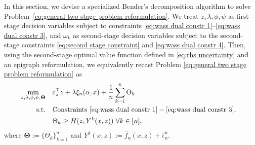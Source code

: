\documentclass[onefignum,onetabnum]{siamart251216}
\begin{document}
In this section, we devise a specialized Bender's decomposition algorithm to solve Problem\ \eqref{eq:general two stage problem reformulation}. We treat $z,\lambda,\phi,\psi$ as first-stage decision variables subject to constraints \eqref{eq:wass dual constr 1}--\eqref{eq:wass dual constr 3}, and $\omega_k$ as second-stage decision variables subject to the second-stage constraints \eqref{eq:second stage constraint} and \eqref{eq:wass dual constr 4}. Then, using the second-stage optimal value function defined in \eqref{eq:rhs uncertainty} and an epigraph reformulation, we equivalently recast Problem \eqref{eq:general two stage problem reformulation}   as\vspace*{-0.05in} 
\begin{align} 
    \min_{z, \lambda, \phi, \psi, \mathbf{\Theta}} \quad & c_z^\top z + \lambda \xi_n(\alpha,x) + \frac{1}{n} \sum_{k=1}^n\Theta_k \label{eq:full benders problem} \\
    \textrm{s.t.}\quad & \text{Constraints}\ \eqref{eq:wass dual constr 1}-\eqref{eq:wass dual constr 3}, \nonumber \\
    \quad & \Theta_k \ge H(z,Y^k(x,z))\ \forall k\in[n], \nonumber
\end{align}
where $\mathbf{\Theta}:=\{\Theta_k\}_{k=1}^n$ and $Y^k(x,z):=\hat{f}_n(x,z) + \hat{\epsilon}_n^k$.
\end{document}
